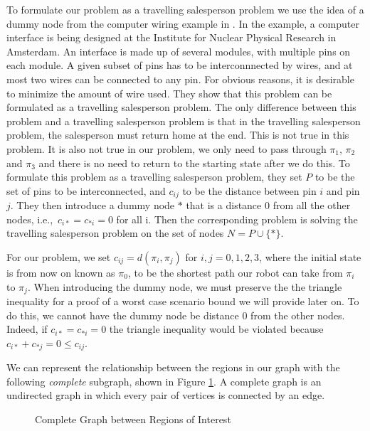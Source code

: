 To formulate our problem as a travelling salesperson problem we use the idea of a dummy node from the computer wiring example in \cite{lenstra75}. In the example, a computer interface is being designed at the Institute for Nuclear Physical Research in Amsterdam. An interface is made up of several modules, with multiple pins on each module. A given subset of pins has to be interconnnected by wires, and at most two wires can be connected to any pin. For obvious reasons, it is desirable to minimize the amount of wire used. They show that this problem can be formulated as a travelling salesperson problem. The only difference between this problem and a travelling salesperson problem is that in the travelling salesperson problem, the salesperson must return home at the end. This is not true in this problem. It is also not true in our problem, we only need to pass through $\pi_1$, $\pi_2$ and $\pi_3$ and there is no need to return to the starting state after we do this. To formulate this problem as a travelling salesperson problem, they set $P$ to be the set of pins to be interconnected, and $c_{ij}$ to be the distance between pin $i$ and pin $j$. They then introduce a dummy node $*$ that is a distance 0 from all the other nodes, i.e.,\ $c_{i*} = c_{*i} = 0$ for all i. Then the corresponding problem is solving the travelling salesperson problem on the set of nodes $N=P \cup \{*\}$. 

For our problem, we set $c_{ij}=d(\pi_i , \pi_j)$ for $i,j=0,1,2,3$, where the initial state is from now on known as $\pi_0$, to be the shortest path our robot can take from $\pi_i$ to $\pi_j$. When introducing the dummy node, we must preserve the the triangle inequality for a proof of a worst case scenario bound we will provide later on. To do this, we cannot have the dummy node be distance 0 from the other nodes. Indeed, if $c_{i*} = c_{*i} = 0 $ the triangle inequality would be violated because $c_{i*} + c_{*j} = 0 \leq c_{ij}$.

We can represent the relationship between the regions in our graph with the following \textit{complete} subgraph, shown in Figure \ref{fig:completeGraph}. A complete graph is an undirected graph in which every pair of vertices is connected by an edge. 
\begin{figure}
\centering
{}
\caption{Complete Graph between Regions of Interest}
\label{fig:completeGraph}
\end{figure}

